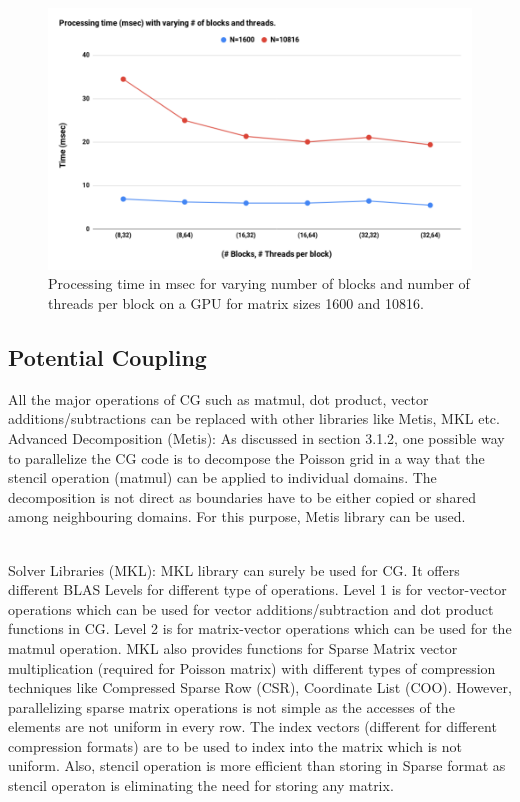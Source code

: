 \documentclass{article}
\begin{document}
\begin{spacing}{1.1}
\begin{center}
	\begin{figure}[H]
	\centering
       \includegraphics[scale=.40]{proctime.png}
        \caption{\label{gpu_scaling} Processing time in msec for varying number of blocks and number of threads per block on a GPU for matrix sizes 1600 and 10816.} 
	\end{figure}
\end{center}

\subsection{Potential Coupling}


    All the major operations of CG such as matmul, dot product, vector additions/subtractions can be replaced with other libraries like Metis, MKL etc. \\ 
    Advanced Decomposition (Metis): As discussed in section 3.1.2, one possible way to parallelize the CG code is to decompose the Poisson grid in a way that the stencil operation (matmul) can be applied to individual domains. The decomposition is not direct as boundaries have to be either copied or shared among neighbouring domains. For this purpose, Metis library can be used. 
    
    \\
    Solver Libraries (MKL): MKL library can surely be used for CG. It offers different BLAS Levels for different type of operations. Level 1 is for vector-vector operations which can be used for vector additions/subtraction and dot product functions in CG. Level 2 is for matrix-vector operations which can be used for the matmul operation. MKL also provides functions for Sparse Matrix vector multiplication (required for Poisson matrix) with different types of compression techniques like Compressed Sparse Row (CSR), Coordinate List (COO). However, parallelizing sparse matrix operations is not simple as the accesses of the elements are not uniform in every row. The index vectors (different for different compression formats) are to be used to index into the matrix which is not uniform. Also, stencil operation is more efficient than storing in Sparse format as stencil operaton is eliminating the need for storing any matrix. 
    

\end{spacing}
\end{document}
